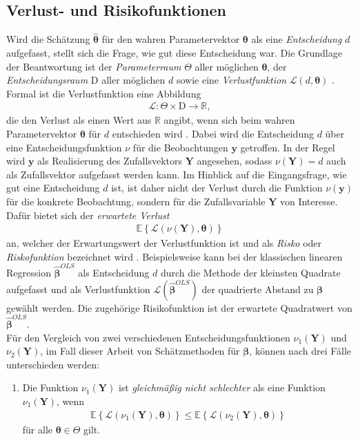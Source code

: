 \documentclass[12pt, a4paper]{report}\usepackage[]{graphicx}\usepackage[]{color}
\begin{document}
\begin{appendix}
\section{Verlust- und Risikofunktionen}\label{App_Risikofunktion}
Wird die Schätzung $\boldsymbol{\hat{\theta}}$ für den wahren Parametervektor $\boldsymbol{\theta}$ als eine \textit{Entscheidung} $d$ aufgefasst, stellt sich die Frage, wie gut diese Entscheidung war. Die Grundlage der Beantwortung ist der \textit{Parameterraum} $\Theta$ aller möglichen $\boldsymbol{\theta}$, der \textit{Entscheidungsraum} $\text{D}$ aller möglichen $d$ sowie eine \textit{Verlustfunktion} $\mathscr{L}(d,\boldsymbol{\theta})$ \cite{judge1985theory}. Formal ist die Verlustfunktion eine Abbildung
\begin{align*}
\mathscr{L}:\Theta \times \text{D} \rightarrow \mathbb{R},
\end{align*}
die den Verlust als einen Wert aus $\mathbb{R}$ angibt, wenn sich beim wahren Parametervektor $\boldsymbol{\theta}$ für $d$ entschieden wird \cite{gross2003linear}. Dabei wird die Entscheidung $d$ über eine Entscheidungsfunktion $\nu$ für die Beobachtungen $\mathbf{y}$ getroffen. In der Regel wird $\mathbf{y}$ als Realisierung des Zufallsvektors $\mathbf{Y}$ angesehen, sodass $\nu(\mathbf{Y})=d$ auch als Zufallsvektor aufgefasst werden kann. Im Hinblick auf die Eingangsfrage, wie gut eine Entscheidung $d$ ist, ist daher nicht der Verlust durch die Funktion $\nu(\mathbf{y})$ für die konkrete Beobachtung, sondern für die Zufallsvariable $\mathbf{Y}$ von Interesse. Dafür bietet sich der \textit{erwartete Verlust} 
\begin{align*}
\mathbb{E} \left\lbrace \mathscr{L}(\nu(\mathbf{Y}),\boldsymbol{\theta}) \right\rbrace
\end{align*}
an, welcher der Erwartungswert der Verlustfunktion ist und als \textit{Risko} oder \textit{Riskofunktion} bezeichnet wird \cite{gross2003linear,judge1985theory}.
Beispielsweise kann bei der klassischen linearen Regression $\boldsymbol{\hat{\beta}}^{OLS}$ als Entscheidung $d$ durch die Methode der kleinsten Quadrate aufgefasst und als Verlustfunktion $\mathscr{L}(\boldsymbol{\hat{\beta}}^{OLS})$ der quadrierte Abstand zu $\boldsymbol{\beta}$ gewählt werden. Die zugehörige Risikofunktion ist der erwartete Quadratwert von $\boldsymbol{\hat{\beta}}^{OLS}$.\\
Für den Vergleich von zwei verschiedenen Entscheidungsfunktionen $\nu_1(\mathbf{Y})$ und $\nu_2(\mathbf{Y})$, im Fall dieser Arbeit von Schätzmethoden für $\boldsymbol{\beta}$, können nach  drei Fälle unterschieden werden: 
\begin{enumerate}
\item Die Funktion $\nu_1(\mathbf{Y})$ ist \textit{gleichmäßig nicht schlechter} als eine Funktion $\nu_1(\mathbf{Y})$, wenn
\begin{align*}
\mathbb{E} \left\lbrace \mathscr{L}(\nu_1(\mathbf{Y}),\boldsymbol{\theta}) \right\rbrace \leq \mathbb{E} \left\lbrace \mathscr{L}(\nu_2(\mathbf{Y}),\boldsymbol{\theta}) \right\rbrace
\end{align*}
für alle $\boldsymbol{\theta} \in \Theta$ gilt.


\end{enumerate}
\end{appendix}
\end{document}
